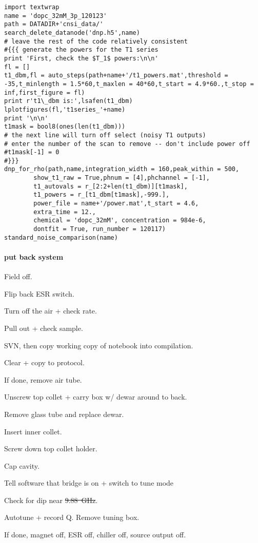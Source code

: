 \begin{tiny}
\begin{lstlisting}
import textwrap
name = 'dopc_32mM_3p_120123'
path = DATADIR+'cnsi_data/'
search_delete_datanode('dnp.h5',name)
# leave the rest of the code relatively consistent
#{{{ generate the powers for the T1 series
print 'First, check the $T_1$ powers:\n\n'
fl = []
t1_dbm,fl = auto_steps(path+name+'/t1_powers.mat',threshold = -35,t_minlength = 1.5*60,t_maxlen = 40*60,t_start = 4.9*60.,t_stop = inf,first_figure = fl)
print r't1\_dbm is:',lsafen(t1_dbm)
lplotfigures(fl,'t1series_'+name)
print '\n\n'
t1mask = bool8(ones(len(t1_dbm)))
# the next line will turn off select (noisy T1 outputs)
# enter the number of the scan to remove -- don't include power off
#t1mask[-1] = 0
#}}}
dnp_for_rho(path,name,integration_width = 160,peak_within = 500,
        show_t1_raw = True,phnum = [4],phchannel = [-1],
        t1_autovals = r_[2:2+len(t1_dbm)][t1mask],
        t1_powers = r_[t1_dbm[t1mask],-999.],
        power_file = name+'/power.mat',t_start = 4.6,
        extra_time = 12.,
        chemical = 'dopc_32mM', concentration = 984e-6,
        dontfit = True, run_number = 120117)
standard_noise_comparison(name)
\end{lstlisting}
\end{tiny}

\paragraph{put back system}

Field off.


Flip back ESR switch.

Turn off the air + check rate.

Pull out + check sample.

SVN, then copy working copy of notebook into compilation.



Clear + copy to protocol.

\timeblockend
If done, remove air tube.

Unscrew top collet + carry box w/ dewar around to back.

Remove glass tube and replace dewar.

Insert inner collet.

Screw down top collet holder.

Cap cavity.

Tell software that bridge is on + switch to tune mode

Check for dip near \sout{9.88~GHz}.

Autotune + record Q.
Remove tuning box.

If done, magnet off, ESR off, chiller off, source output off.

